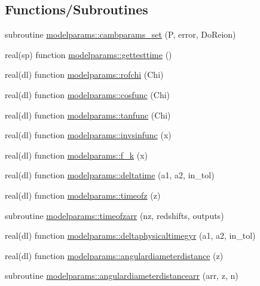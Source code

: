 \subsection*{Functions/\+Subroutines}
\begin{DoxyCompactItemize}
\item 
subroutine \mbox{\hyperlink{namespacemodelparams_a13f805ae3c4213f4c9204bf8d8f17350}{modelparams\+::cambparams\+\_\+set}} (P, error, Do\+Reion)
\item 
real(sp) function \mbox{\hyperlink{namespacemodelparams_a2abd5cb7bfc9c34a736d91ed5863552d}{modelparams\+::gettesttime}} ()
\item 
real(dl) function \mbox{\hyperlink{namespacemodelparams_a09b856ca78d2c38cb9746680ce7a4d9f}{modelparams\+::rofchi}} (Chi)
\item 
real(dl) function \mbox{\hyperlink{namespacemodelparams_af941ff2f9683e6bf6994f87b27ea9427}{modelparams\+::cosfunc}} (Chi)
\item 
real(dl) function \mbox{\hyperlink{namespacemodelparams_ade19d5a5ee3bef508e781d64c8c667ae}{modelparams\+::tanfunc}} (Chi)
\item 
real(dl) function \mbox{\hyperlink{namespacemodelparams_a463f6e148b9f2c45ec30cb28c29bb4e3}{modelparams\+::invsinfunc}} (x)
\item 
real(dl) function \mbox{\hyperlink{namespacemodelparams_ad0ec1bb07f7e0295749e801b141bfc0f}{modelparams\+::f\+\_\+k}} (x)
\item 
real(dl) function \mbox{\hyperlink{namespacemodelparams_ae583f09e6523f430605f421d2db537ae}{modelparams\+::deltatime}} (a1, a2, in\+\_\+tol)
\item 
real(dl) function \mbox{\hyperlink{namespacemodelparams_ae8f7910867e2ed755e7f4d5eacdeee2d}{modelparams\+::timeofz}} (z)
\item 
subroutine \mbox{\hyperlink{namespacemodelparams_aa9fc9f952c72345785fa69b491e598d5}{modelparams\+::timeofzarr}} (nz, redshifts, outputs)
\item 
real(dl) function \mbox{\hyperlink{namespacemodelparams_ac094d31babe3489387c12a3c2ab05549}{modelparams\+::deltaphysicaltimegyr}} (a1, a2, in\+\_\+tol)
\item 
real(dl) function \mbox{\hyperlink{namespacemodelparams_a63c764e54b9b02649d00f8071cb9297f}{modelparams\+::angulardiameterdistance}} (z)
\item 
subroutine \mbox{\hyperlink{namespacemodelparams_a31cf59c4ca59e0bc5c8c2b45a8f3487e}{modelparams\+::angulardiameterdistancearr}} (arr, z, n)
\item 

\end{DoxyCompactItemize}
